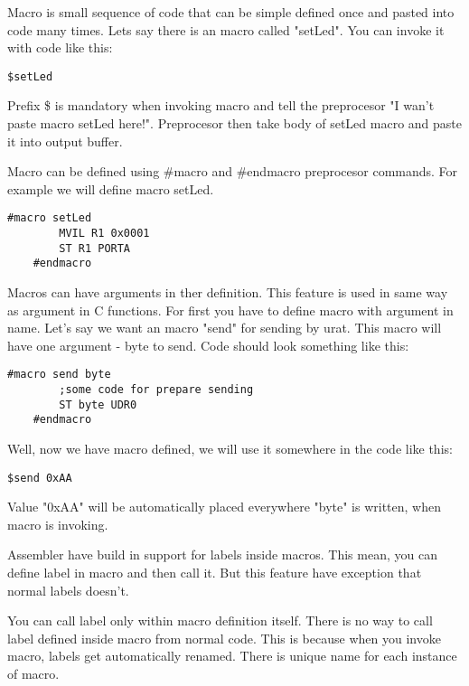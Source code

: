 Macro is small sequence of code that can be simple defined once and pasted into
code many times. Lets say there is an macro called "setLed". You can invoke it
with code like this:

\begin{lstlisting}[language={[x86masm]Assembler}, frame=single]
    $setLed
\end{lstlisting}

Prefix \$ is mandatory when invoking macro and tell the preprocesor "I wan't
paste macro setLed here!". Preprocesor then take body of setLed macro and paste
it into output buffer.

Macro can be defined using \#macro and \#endmacro preprocesor commands. For
example we will define macro setLed.

\begin{lstlisting}[language={[x86masm]Assembler}, frame=single]
    #macro setLed
        MVIL R1 0x0001
        ST R1 PORTA
    #endmacro
\end{lstlisting}

Macros can have arguments in ther definition. This feature is used in same way
as argument in C functions. For first you have to define macro with argument in
name. Let's say we want an macro "send" for sending by urat. This macro will
have one argument - byte to send. Code should look something like this:

\begin{lstlisting}[language={[x86masm]Assembler}, frame=single]
    #macro send byte
        ;some code for prepare sending
        ST byte UDR0
    #endmacro
\end{lstlisting}

Well, now we have macro defined, we will use it somewhere in the code like this:

\begin{lstlisting}[language={[x86masm]Assembler}, frame=single]
    $send 0xAA
\end{lstlisting}

Value "0xAA" will be automatically placed everywhere "byte" is written, when
macro is invoking.

Assembler have build in support for labels inside macros. This mean, you can
define label in macro and then call it. But this feature have exception that
normal labels doesn't.

You can call label only within macro definition itself. There is no way to call
label defined inside macro from normal code. This is because when you invoke
macro, labels get automatically renamed. There is unique name for each instance
of macro.

